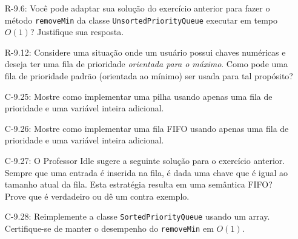 \begin{enumerate}
\begin{itemize}
		\item[R-9.6:] Você pode adaptar sua solução do exercício anterior para fazer o método \texttt{removeMin} da classe \texttt{UnsortedPriorityQueue} executar em tempo $O(1)$? Justifique sua resposta.
		
		\item[R-9.12:] Considere uma situação onde um usuário possui chaves numéricas e deseja ter uma fila de prioridade \textit{orientada para o máximo}. Como pode uma fila de prioridade padrão (orientada ao mínimo) ser usada para tal propósito?
		
		\item[C-9.25:] Mostre como implementar uma pilha usando apenas uma fila de prioridade e uma variável inteira adicional.
		
		\item[C-9.26:] Mostre como implementar uma fila FIFO usando apenas uma fila de prioridade e uma variável inteira adicional.
		
		\item[C-9.27:] O Professor Idle sugere a seguinte solução para o exercício anterior. Sempre que uma entrada é inserida na fila, é dada uma chave que é igual ao tamanho atual da fila. Esta estratégia resulta em uma semântica FIFO? Prove que é verdadeiro ou dê um contra exemplo.
		
		\item[C-9.28:] Reimplemente a classe \texttt{SortedPriorityQueue} usando um array. Certifique-se de manter o desempenho do \texttt{removeMin} em $O(1)$.
	\end{itemize}
\end{enumerate}

\bigskip

\begingroup
	\footnotesize
	\renewcommand{\chapter}[2]{}%
	
	
\endgroup

